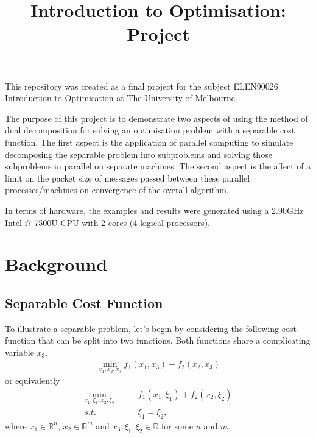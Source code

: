 \documentclass[12pt]{article}
\begin{document}
\title{Introduction to Optimisation: Project}
\author{}
\date{}
\maketitle

This repository was created as a final project for the subject ELEN90026 Introduction to Optimisation at The University of Melbourne.

The purpose of this project is to demonstrate two aspects of using the method of dual decomposition for solving an optimisation problem with a separable cost function. The first aspect is the application of parallel computing to simulate decomposing the separable problem into subproblems and solving those subproblems in parallel on separate machines. The second aspect is the affect of a limit on the packet size of messages passed between these parallel processes/machines on convergence of the overall algorithm.

In terms of hardware, the examples and results were generated using a 2.90GHz Intel i7-7500U CPU with 2 cores (4 logical processors).

\section*{Background}

\subsection*{Separable Cost Function}
To illustrate a separable problem, let's begin by considering the following cost function that can be split into two functions. Both functions share a complicating variable $x_3$.
\begin{align*}
\min_{x_1,x_2,x_3}f_1(x_1,x_3)+f_2(x_2,x_3)
\end{align*}
or equivalently
\begin{align*}
\min_{x_1,\xi_1,x_2,\xi_2}\qquad&f_1(x_1,\xi_1)+f_2(x_2,\xi_2)\\
s.t.\qquad&\xi_1=\xi_2,
\end{align*}
where $x_1\in\mathbb{R}^n$, $x_2\in\mathbb{R}^m$ and $x_3,\xi_1,\xi_2\in\mathbb{R}$ for some $n$ and $m$.
\end{document}
